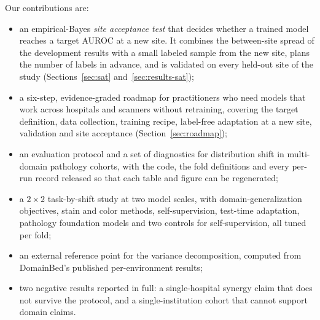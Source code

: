 Our contributions are:
\begin{itemize}
  \item an empirical-Bayes \emph{site acceptance test} that decides whether a
    trained model reaches a target AUROC at a new site. It combines the
    between-site spread of the development results with a small labeled sample
    from the new site, plans the number of labels in advance, and is validated
    on every held-out site of the study (Sections~\ref{sec:sat}
    and~\ref{sec:results-sat});
  \item a six-step, evidence-graded roadmap for practitioners who need models
    that work across hospitals and scanners without retraining, covering the
    target definition, data collection, training recipe, label-free adaptation
    at a new site, validation and site acceptance
    (Section~\ref{sec:roadmap});
  \item an evaluation protocol and a set of diagnostics for distribution shift
    in multi-domain pathology cohorts, with the code, the fold definitions and
    every per-run record released so that each table and figure can be
    regenerated;
  \item a $2\times2$ task-by-shift study at two model scales, with
    domain-generalization objectives, stain and color methods,
    self-supervision, test-time adaptation, pathology foundation models and
    two controls for self-supervision, all tuned per fold;
  \item an external reference point for the variance decomposition, computed
    from DomainBed's published per-environment results;
  \item two negative results reported in full: a single-hospital synergy
    claim that does not survive the protocol, and a single-institution cohort
    that cannot support domain claims.
\end{itemize}

